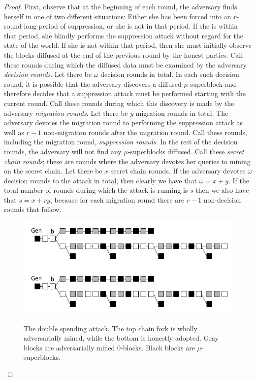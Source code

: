 \begin{proof}
First, observe that at the beginning of each round, the adversary finds herself
in one of two different situations: Either she has been forced into an
$r$-round-long period of suppression, or she is not in that period. If she is
within that period, she blindly performs the suppression attack without regard
for the state of the world. If she is not within that period, then she must
initially observe the blocks diffused at the end of the previous round by the
honest parties. Call these rounds during which the diffused data must be
examined by the adversary \textit{decision rounds}. Let there be $\omega$
decision rounds in total. In each such decision round, it is possible that the
adversary discovers a diffused $\mu$-superblock and therefore decides that a
suppression attack must be performed starting with the current round. Call these
rounds during which this discovery is made by the adversary \textit{migration
rounds}. Let there be $y$ migration rounds in total. The adversary devotes the
migration round to performing the suppression attack as well as $r - 1$
non-migration rounds after the migration round. Call these rounds, including the
migration round, \textit{suppression rounds}. In the rest of the decision
rounds, the adversary will not find any $\mu$-superblocks diffused. Call these
\textit{secret chain rounds}; these are rounds where the adversary devotes her
queries to mining on the secret chain. Let there be $x$ secret chain rounds. If
the adversary devotes $\omega$ decision rounds to the attack in total, then
clearly we have that $\omega = x + y$. If the total number of rounds during
which the attack is running is $s$ then we also have that $s = x + ry$, because
for each migration round there are $r - 1$ non-decision rounds that follow.

\begin{figure}[t]
    \caption{The double spending attack.
    The top chain fork is wholly adversarially mined, while the bottom is
    honestly adopted. Gray blocks are adversarially mined 0-blocks.
    Black blocks are $\mu$-superblocks.}
    \centering
    \iftwocolumn
        \includegraphics[width=1.5\columnwidth,keepaspectratio]{figures/double-spend-popow.png}
    \else
        \includegraphics[width=0.7\columnwidth,keepaspectratio]{figures/double-spend-popow.png}
    \fi
    \label{fig.double-spend}
\end{figure}


\end{proof}
